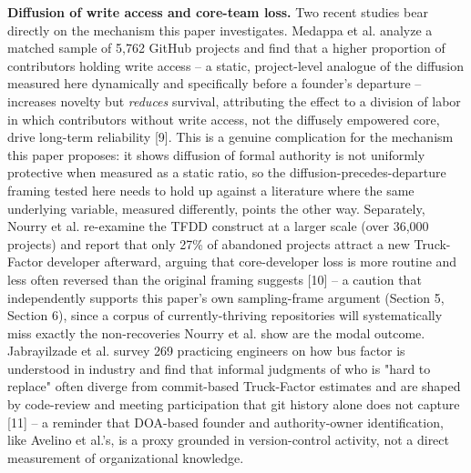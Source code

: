 \documentclass[11pt,letterpaper]{article}
\begin{document}
\textbf{Diffusion of write access and core-team loss.} Two recent studies bear directly on the mechanism this paper investigates. Medappa et al. analyze a matched sample of 5,762 GitHub projects and find that a higher proportion of contributors holding write access -- a static, project-level analogue of the diffusion measured here dynamically and specifically before a founder's departure -- increases novelty but \emph{reduces} survival, attributing the effect to a division of labor in which contributors without write access, not the diffusely empowered core, drive long-term reliability [9]. This is a genuine complication for the mechanism this paper proposes: it shows diffusion of formal authority is not uniformly protective when measured as a static ratio, so the diffusion-precedes-departure framing tested here needs to hold up against a literature where the same underlying variable, measured differently, points the other way. Separately, Nourry et al. re-examine the TFDD construct at a larger scale (over 36,000 projects) and report that only 27\% of abandoned projects attract a new Truck-Factor developer afterward, arguing that core-developer loss is more routine and less often reversed than the original framing suggests [10] -- a caution that independently supports this paper's own sampling-frame argument (Section 5, Section 6), since a corpus of currently-thriving repositories will systematically miss exactly the non-recoveries Nourry et al. show are the modal outcome. Jabrayilzade et al. survey 269 practicing engineers on how bus factor is understood in industry and find that informal judgments of who is "hard to replace" often diverge from commit-based Truck-Factor estimates and are shaped by code-review and meeting participation that git history alone does not capture [11] -- a reminder that DOA-based founder and authority-owner identification, like Avelino et al.'s, is a proxy grounded in version-control activity, not a direct measurement of organizational knowledge.
\end{document}
